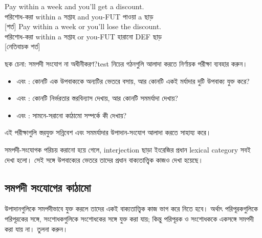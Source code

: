\ea \label{ex:coord-meaning-bn}
    \ea \gll Pay within a week and you'll get a discount.\\
        পরিশোধ-করা within a সপ্তাহ and you-FUT পাওয়া a ছাড়\\
    \glt {} [শর্ত]
    \ex \gll Pay within a week or you'll lose the discount.\\
        পরিশোধ-করা within a সপ্তাহ or you-FUT হারানো DEF ছাড়\\
    \glt {} [নেতিবাচক শর্ত]
    \z
\z

\begin{tblsframedsymbol}{ছক চেনা: সমপদী সংযোগ না অধীনীকরণ?}{test}
নিচের গঠনগুলি আলাদা করতে নির্ণায়ক পরীক্ষা ব্যবহার করুন।
\begin{itemize}[noitemsep, leftmargin=*]
    \item {} এবং : কোনটি এক উপবাক্যকে অন্যটির ভেতরে বসায়, আর কোনটি একই মর্যাদার দুটি উপবাক্য যুক্ত করে?
    \item {} এবং : কোনটি নির্ভরতার স্তরবিন্যাস দেখায়, আর কোনটি সমমর্যাদা দেখায়?
    \item {} এবং : সামনে-সরানো কাঠামো সম্পর্কে কী দেখায়?
\end{itemize}
এই পরীক্ষাগুলি স্তরযুক্ত সন্নিবেশ এবং সমমর্যাদার উপাদান-সংযোগ আলাদা করতে সাহায্য করে।
\end{tblsframedsymbol}

সমপদী-সংযোগক পরিচয় করানো হয়ে গেলে, interjection ছাড়া ইংরেজির প্রধান lexical category সবই দেখা হলো। সেই সঙ্গে উপবাক্যের ভেতরে তাদের প্রধান বাক্যতাত্ত্বিক কাজও দেখা হয়েছে।

\subsection{সমপদী সংযোগের কাঠামো}

উপাদানগুলিকে সমপদীভাবে যুক্ত করলে তাদের একই বাক্যতাত্ত্বিক কাজ ভাগ করে নিতে হবে। অর্থাৎ পরিপূরকগুলিকে পরিপূরকের সঙ্গে, সংশোধকগুলিকে সংশোধকের সঙ্গে যুক্ত করা যায়; কিন্তু পরিপূরক ও সংশোধককে একসঙ্গে সমপদী করা যায় না। তুলনা করুন।

